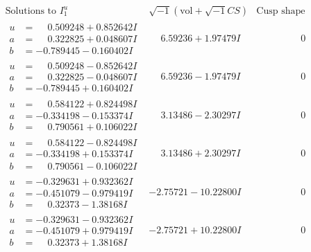 \documentclass[1p]{elsarticle_modified}
\theoremstyle{definition}
\newcommand{\I}{\sqrt{-1}}
\begin{document}
$$\begin{array}{c|c|c}  
\text{Solutions to }I^u_{1}& \I (\text{vol} + \sqrt{-1}CS) & \text{Cusp shape}\\
 \hline 
\begin{aligned}
u &= \phantom{-}0.509248 + 0.852642 I \\
a &= \phantom{-}0.322825 + 0.048607 I \\
b &= -0.789445 - 0.160402 I\end{aligned}
 & \phantom{-}6.59236 + 1.97479 I & \phantom{-0.000000 } 0 \\ \hline\begin{aligned}
u &= \phantom{-}0.509248 - 0.852642 I \\
a &= \phantom{-}0.322825 - 0.048607 I \\
b &= -0.789445 + 0.160402 I\end{aligned}
 & \phantom{-}6.59236 - 1.97479 I & \phantom{-0.000000 } 0 \\ \hline\begin{aligned}
u &= \phantom{-}0.584122 + 0.824498 I \\
a &= -0.334198 - 0.153374 I \\
b &= \phantom{-}0.790561 + 0.106022 I\end{aligned}
 & \phantom{-}3.13486 - 2.30297 I & \phantom{-0.000000 } 0 \\ \hline\begin{aligned}
u &= \phantom{-}0.584122 - 0.824498 I \\
a &= -0.334198 + 0.153374 I \\
b &= \phantom{-}0.790561 - 0.106022 I\end{aligned}
 & \phantom{-}3.13486 + 2.30297 I & \phantom{-0.000000 } 0 \\ \hline\begin{aligned}
u &= -0.329631 + 0.932362 I \\
a &= -0.451079 - 0.979419 I \\
b &= \phantom{-}0.32373 - 1.38168 I\end{aligned}
 & -2.75721 - 10.22800 I & \phantom{-0.000000 } 0 \\ \hline\begin{aligned}
u &= -0.329631 - 0.932362 I \\
a &= -0.451079 + 0.979419 I \\
b &= \phantom{-}0.32373 + 1.38168 I\end{aligned}
 & -2.75721 + 10.22800 I & \phantom{-0.000000 } 0 \\ \hline\begin{aligned}

\end{aligned}
\end{array}$$
\end{document}
